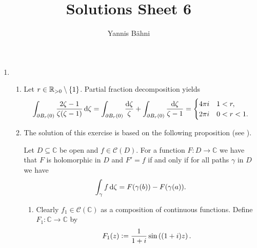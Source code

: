 

\title{Solutions Sheet 6}
\author{Yannis B\"{a}hni}
\address[Yannis B\"{a}hni]{University of Zurich, R\"{a}mistrasse 71, 8006 Zurich}


\maketitle
\thispagestyle{fancy}
\begin{enumerate}[label = \textbf{Exercise \arabic*.},wide = 0pt, itemsep=1.5ex]
	\item
		~
		\begin{enumerate}[label = (\alph*),wide = 0pt, itemsep=1.5ex]
			\item Let $r \in \mathbb{R}_{>0} \setminus \cbr[0]{1}$. Partial fraction decomposition yields
				\begin{align}
					\int_{\partial B_r(0)} \frac{2\zeta - 1}{\zeta(\zeta - 1)}\mathop{}\!\mathrm{d} \zeta = \int_{\partial B_r(0)} \frac{\mathop{}\!\mathrm{d}\zeta}{\zeta} + \int_{\partial B_r(0)}\frac{\mathop{}\!\mathrm{d}\zeta}{\zeta - 1} = \begin{cases}
						4\pi i & 1 < r,\\
						2\pi i & 0 < r < 1.
					\end{cases}
				\end{align} 
			\item The solution of this exercise is based on the following proposition (see \cite[165]{remmert2002funktionentheorie}).
				\begin{proposition}
					Let $D \subseteq \mathbb{C}$ be open and $f \in \mathscr{C}(D)$. For a function $F: D \to \mathbb{C}$ we have that $F$ is holomorphic in $D$ and $F' = f$ if and only if for all paths $\gamma$ in $D$ we have
					\begin{equation}
						\int_{\gamma} f \mathop{}\!\mathrm{d} \zeta = F(\gamma(b)) - F(\gamma(a)).
					\end{equation}
				\end{proposition}
				\begin{enumerate}[label = (\roman*),wide = 0pt, itemsep=1.5ex]
					\item Clearly $f_1 \in \mathscr{C}(\mathbb{C})$ as a composition of continuous functions. Define $F_1: \mathbb{C} \to \mathbb{C}$ by
						\begin{equation}
							F_1(z) := \frac{1}{1 + i}\sin\del[0]{(1 + i)z}.
						\end{equation}


\end{enumerate}
\end{enumerate}
\end{enumerate}
